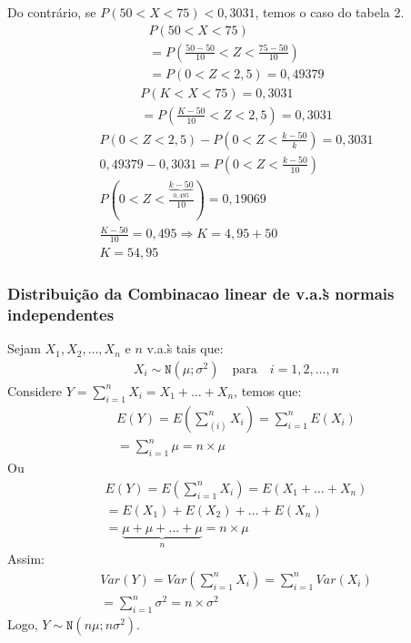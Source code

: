 \begin{description}
\begin{description}
\begin{description}
\begin{enumerate}[label=(\alph*)]
    Do contrário, se $P(50 < X < 75) < 0,3031$, temos o caso do tabela 2.
    \begin{align*}
      P(50 < X < 75)  \\
      =P(\frac{50-50}{10} < Z < \frac{75-50}{10}) \\
      =P(0 < Z < 2,5) = 0,49379
    \end{align*}
    \begin{align*}
      P(K < X < 75)  = 0,3031\\
      =P(\frac{K-50}{10}< Z <2,5)= 0,3031
    \end{align*}
    \begin{align*}
      P(0 < Z < 2,5)  - P(0 < Z  < \frac{k-50}{k})=0,3031 \\
      0,49379 - 0,3031 = P(0 < Z < \frac{k-50}{10}) \\
      P(0<Z < \frac{\underbrace{k-50}_{0,495}}{10})= 0,19069  \\
      \frac{K-50}{10}= 0,495 \Rightarrow  K=4,95 +50 \\
      K=54,95
    \end{align*}
\end{enumerate}

    \end{description}
  \end{description}
  \subsubsection{Distribuição da Combinacao linear de v.a.\`s normais independentes}
  \begin{description}
    \item Sejam $X_1, X_2 , \ldots, X_n $ e  $n$ v.a.\`s tais que:
  \begin{align*}
    X_i \sim \mathtt{N}(\mu ; \sigma^2)  \quad \text{para} \quad i=1,2,\ldots,n
  \end{align*}
  Considere $Y= \sum_{i=1}^{n} X_i = X_1+\ldots+X_n$, temos que:
  \begin{align*}
    E(Y)  = E( \sum \limits_{(i)}^{n} X_i ) = \sum_{i=1}^{n} E(X_i) \\
    = \sum_{i=1}^{n} \mu = n \times \mu
  \end{align*}
  Ou
  \begin{align*}
    E(Y )  =E( \sum_{i=1}^n X_i )= E(X_1 + \ldots +X_n) \\
    = E(X_1) +E(X_2) + \ldots +E(X_n)\\
    =\underbrace{\mu + \mu + \dots + \mu}_{n} = n \times \mu
  \end{align*}
  Assim:
  \begin{align*}
    Var(Y) = Var(\sum_{i=1}^{n} X_i)= \sum^{n}_{i=1} Var(X_i) \\
    = \sum_{i=1}^{n} \sigma^2 = n  \times \sigma^2
  \end{align*}
  Logo, $Y \sim \mathtt{N}(n\mu ; n \sigma^2)$.


\end{description}
\end{description}
